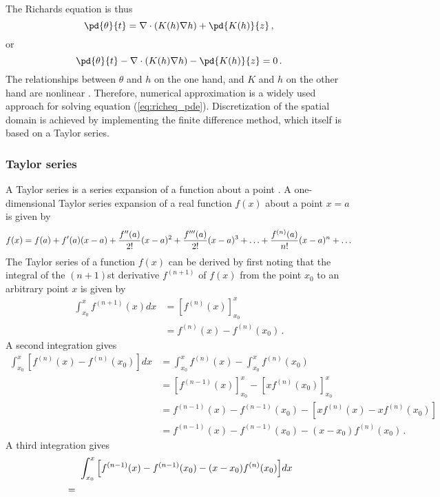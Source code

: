 The Richards equation is thus
\begin{equation}
  \label{eq:richeq_simple}
  \pd{\theta}{t} = \nabla \cdot \left( K(h) \nabla h \right) + \pd{K(h)}{z} \, ,
\end{equation}
or
\begin{equation}
  \label{eq:richeq_pde}
  \pd{\theta}{t} - \nabla \cdot \left( K(h) \nabla h \right) - \pd{K(h)}{z} = 0 \, .
\end{equation}
The relationships between $\theta$ and $h$ on the one hand, and $K$ and $h$ on the other hand are nonlinear \parencite{celia_general_1990}.  Therefore, numerical approximation is a widely used approach for solving equation (\ref{eq:richeq_pde}).  Discretization of the spatial domain is achieved by implementing the finite difference method, which itself is based on a Taylor series.

\subsubsection{Taylor series}
A Taylor series is a series expansion of a function about a point \parencite{Weisstein2017}.  A one-dimensional Taylor series expansion of a real function $f(x)$ about a point $x = a$ is given by
\begin{equation*}
  \label{eq:tayse}
  f(x)=f(a)+f'(a)(x-a)+\frac{f''(a)}{2!}(x-a)^2+\frac{f'''(a)}{2!}(x-a)^3+\mathellipsis+\frac{f^{(n)}(a)}{n!}(x-a)^n+\mathellipsis
\end{equation*}
The Taylor series of a function $f(x)$ can be derived by first noting that the integral of the $(n+1)$st derivative $f^{(n+1)}$ of $f(x)$ from the point $x_0$ to an arbitrary point $x$ is given by
\begin{align*}
  \int_{x_0}^x{f^{(n+1)}(x)dx} &= \left[f^{(n)}(x)\right]_{x_0}^x \\
                               &= f^{(n)}(x) - f^{(n)}(x_0) \, .
\end{align*}
A second integration gives
\begin{align*}
  \int_{x_0}^x{\left[f^{(n)}(x) - f^{(n)}(x_0)\right]}dx &= \int_{x_0}^x{f^{(n)}(x)} - \int_{x_0}^x{f^{(n)}(x_0)} \\
                                                       &= \left[f^{(n-1)}(x)\right]_{x_0}^x - \left[x f^{(n)}(x_0)\right]_{x_0}^x \\
                                                       &= f^{(n-1)}(x) - f^{(n-1)}(x_0) - \left[x f^{(n)}(x) - x f^{(n)}(x_0)\right] \\
                                                       &= f^{(n-1)}(x) - f^{(n-1)}(x_0) - (x - x_0) f^{(n)}(x_0) \, .
\end{align*}
A third integration gives
\begin{align*}
  &\makebox[5mm]{}\int_{x_0}^x{\left[f^{(n-1)}(x) - f^{(n-1)}(x_0) - (x - x_0) f^{(n)}(x_0)\right]}dx \\
&= 
\end{align*}


